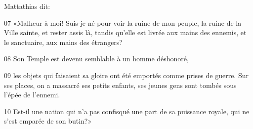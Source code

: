 
Mattathias dit:

07 «Malheur à moi! Suis-je né pour voir la ruine de mon peuple, la ruine de la Ville sainte, et rester assis là, tandis qu’elle est livrée aux mains des ennemis, et le sanctuaire, aux mains des étrangers?

08 Son Temple est devenu semblable à un homme déshonoré,

09 les objets qui faisaient sa gloire ont été emportés comme prises de guerre. Sur ses places, on a massacré ses petits enfants, ses jeunes gens sont tombés sous l’épée de l’ennemi.

10 Est-il une nation qui n’a pas confisqué une part de sa puissance royale, qui ne s’est emparée de son butin?»
